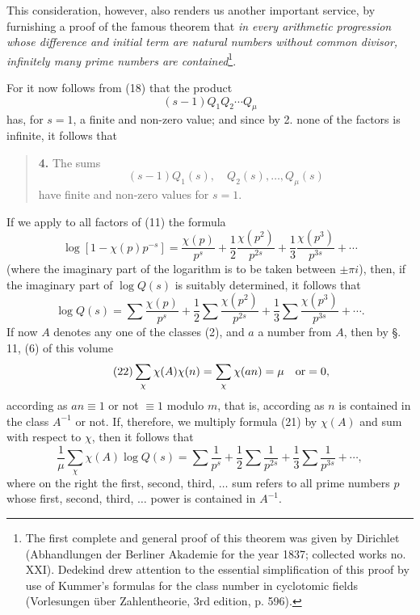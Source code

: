 \documentclass[11pt]{article}
\begin{document}
This consideration, however, also renders us another important service, by furnishing a proof of the famous theorem that \emph{in every arithmetic progression whose difference and initial term are natural numbers without common divisor, infinitely many prime numbers are contained}\footnote{The first complete and general proof of this theorem was given by Dirichlet (Abhandlungen der Berliner Akademie for the year 1837; collected works no. XXI). Dedekind drew attention to the essential simplification of this proof by use of Kummer's formulas for the class number in cyclotomic fields (Vorlesungen über Zahlentheorie, 3rd edition, p. 596).}.

For it now follows from (18) that the product
\[
(s-1)Q_1Q_2\cdots Q_\mu
\]
has, for $s=1$, a finite and non-zero value; and since by 2. none of the factors is infinite, it follows that
\begin{quote}
\textbf{4.} The sums
\[
(s-1)Q_1(s),\quad Q_2(s),\ldots,Q_\mu(s)
\]
have finite and non-zero values for $s=1$.
\end{quote}

If we apply to all factors of (11) the formula
\[
\log[1-\chi(p)p^{-s}]
=\frac{\chi(p)}{p^s}+\frac12\frac{\chi(p^2)}{p^{2s}}+\frac13\frac{\chi(p^3)}{p^{3s}}+\cdots
\]
(where the imaginary part of the logarithm is to be taken between $\pm\pi i$), then, if the imaginary part of $\log Q(s)$ is suitably determined, it follows that
\begin{equation}\tag{21}
\log Q(s)=\sum\frac{\chi(p)}{p^s}+\frac12\sum\frac{\chi(p^2)}{p^{2s}}+\frac13\sum\frac{\chi(p^3)}{p^{3s}}+\cdots .
\end{equation}
If now $A$ denotes any one of the classes (2), and $a$ a number from $A$, then by §. 11, (6) of this volume
\begin{equation}\tag{22}
\sum_\chi \chi(A)\chi(n)=\sum_\chi \chi(an)=\mu\quad\hbox{or}=0,
\end{equation}
according as $an\equiv1$ or not $\equiv1$ modulo $m$, that is, according as $n$ is contained in the class $A^{-1}$ or not. If, therefore, we multiply formula (21) by $\chi(A)$ and sum with respect to $\chi$, then it follows that
\begin{equation}\tag{23}
\frac1\mu\sum_\chi \chi(A)\log Q(s)=
\sum\frac1{p^s}+\frac12\sum\frac1{p^{2s}}+\frac13\sum\frac1{p^{3s}}+\cdots,
\end{equation}
where on the right the first, second, third, $\ldots$ sum refers to all prime numbers $p$ whose first, second, third, $\ldots$ power is contained in $A^{-1}$.
\end{document}
